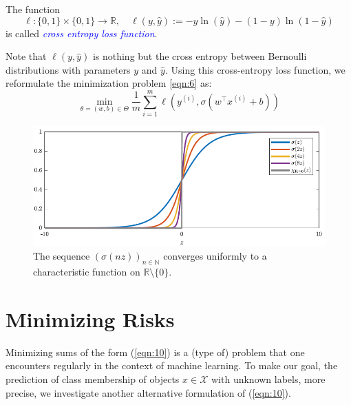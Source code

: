 \begin{definition}
The function
\begin{equation}
    \ell : \{0,1\} \times \{0,1\} \rightarrow \mathbb{R}, \quad \ell(y, \hat{y}):= -y\ln (\hat{y}) - (1-y)\ln(1 - \hat{y})
    \label{eqn:9}
\end{equation}
is called \textcolor{blue}{\emph{cross entropy loss function}}.
\end{definition}

Note that $\ell(y, \hat{y})$ is nothing but the cross entropy between Bernoulli
distributions with parameters $y$ and $\hat{y}$. Using this cross-entropy loss function, we reformulate the minimization problem \ref{eqn:6} as:
\begin{equation}
    \min_{\theta = (w,b) \in \Theta} \frac{1}{m} \sum_{i=1}^{m} \ell (y^{(i)}, \sigma(w^\top x^{(i)}+b))
    \label{eqn:10}
\end{equation}

\begin{figure}[h!]
    \centering
    \includegraphics[width=\textwidth]{images/figure4.png}
    \caption{The sequence $(\sigma(nz))_{n \in \mathbb{N}}$ converges uniformly to a characteristic function on $\mathbb{R} \setminus \{0\}$.}
    \label{fig:4}
\end{figure}


\section{Minimizing Risks}
Minimizing sums of the form (\ref{eqn:10}) is a (type of) problem that one encounters regularly in the context of machine learning. To make our goal, the prediction of class membership of objects $x \in \mathcal{X}$ with unknown labels, more precise, we investigate another alternative formulation of (\ref{eqn:10}).\\

